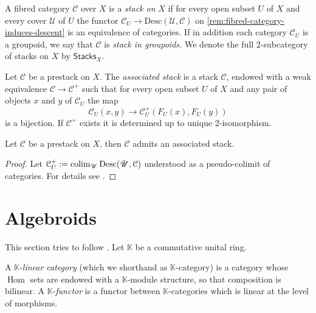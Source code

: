\begin{definition}\label{def:stack}
	A fibred category $\mathcal{C}$ over $X$ is a \textit{stack on} $X$ if for every open subset $U$ of $X$ and every cover $\mathscr{U}$ of $U$ the functor $\mathcal{C}_{U} \to \mathrm{Desc}(\mathscr{U}, \mathcal{C})$ on \cref{rem:fibred-category-induces-descent} is an equivalence of categories. If in addition each category $\mathcal{C}_{U}$ is a groupoid, we say that $\mathcal{C}$ is \textit{stack in groupoids.} We denote the full 2-subcategory of stacks on $X$ by $\mathsf{Stacks}_{X}$.
\end{definition}
\begin{definition}\label{def:associated-stack}
	Let $\mathcal{C}$ be a prestack on $X$. The \textit{associated stack} is a stack $\mathcal{C}$, endowed with a weak equivalence $\mathcal{C} \to \mathcal{C}^{+}$ such that for every open subset $U$ of $X$ and any pair of objects $x$ and $y$ of $\mathcal{C}_{U}$ the map
		\[
			\mathcal{C}_{U}(x,y) \to \mathcal{C}^{+}_{U}(F_{U}(x), F_{U}(y))
		\]
	is a bijection. If $\mathcal{C}^{+}$ exists it is determined up to unique 2-isomorphism. 
\end{definition}
\begin{proposition}\label{prop:stackification}
	Let $\mathcal{C}$ be a prestack on $X$, then $\mathcal{C}$ admits an associated stack. 
\end{proposition}
\begin{proof}
	Let $\mathcal{C}^{+}_{U} := \operatorname*{co{\lim}}_{\mathscr{U}}\mathrm{Desc}(\mathscr{U}, \mathcal{C})$ understood as a pseudo-colimit of categories. For details see \cite[\href{https://stacks.math.columbia.edu/tag/02ZN}{Tag 02ZN}]{stacks-project}. 
\end{proof}


\section{Algebroids}
This section tries to follow \cite[Section 1]{dagnolo-polesello_complex-involutive-submanifolds}. Let $\mathbb{K}$ be a commutative unital ring.
\begin{definition}\label{def:linear-category}
	A $\mathbb{K}$-\emph{linear category} (which we shorthand as $\mathbb{K}$-category) is a category whose $\operatorname{Hom}$ sets are endowed with a $\mathbb{K}$-module structure, so that composition is bilinear. A $\mathbb{K}$-\emph{functor} is a functor between $\mathbb{K}$-categories which is linear at the level of morphisms.
\end{definition}
